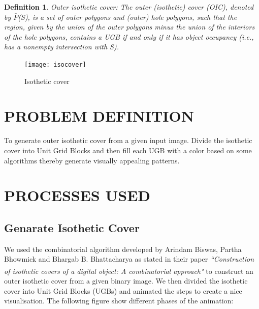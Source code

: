 \documentclass[12pt]{article}
\newtheorem{DEF}{Definition}
\begin{document}
\begin{DEF}
\textnormal{Outer isothetic cover}: The outer (isothetic) cover (OIC), denoted by $\bar{P}$(\textit{S}), is a set of outer polygons and (outer) hole polygons, such that the region, given by the union of the outer polygons minus the union of the interiors of the hole polygons, contains a UGB if and only if it has object occupancy (i.e., has a nonempty intersection with S).
\end{DEF}
\begin{figure}[h]
	\centering
	\texttt{[image: isocover]}
	\caption{Isothetic cover}
	\label{fig:fig_isocover}
\end{figure}


\newpage




\section{PROBLEM DEFINITION}
To generate outer isothetic cover from a given input image. Divide the isothetic cover into Unit Grid Blocks and then fill each UGB with a color based on some algorithms thereby generate visually appealing patterns.


\section{PROCESSES USED}
\subsection{Genarate Isothetic Cover}
We used the combinatorial algorithm developed by Arindam Biswas, Partha Bhowmick and Bhargab B. Bhattacharya as stated in their paper {\em ``Construction of isothetic covers of a digital object: A combinatorial approach"\textsuperscript{\cite{ref1}}} to construct an outer isothetic cover from a given binary image. We then divided the isothetic cover into Unit Grid Blocks (UGBs) and animated the steps to create a nice visualisation. The following figure show different phases of the animation: 
\end{document}
